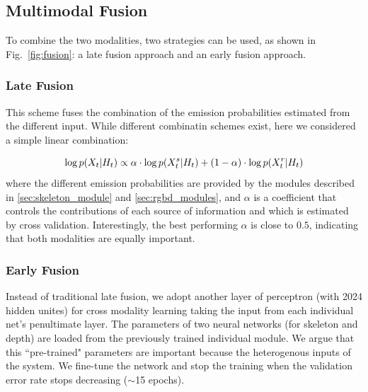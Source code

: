 \subsection{Multimodal Fusion}
To combine the two modalities, two strategies can be used, as shown in Fig.~\ref{fig:fusion}: 
a late fusion approach and an early fusion approach.


\subsubsection{Late Fusion}
%
This scheme fuses the combination of the emission probabilities estimated from the different input. 
While different combinatin schemes exist, here we considered a simple linear combination:

\begin{equation}
\log p(X_t | H_t)  \propto  \alpha \cdot \log p(X_t^s | H_t) + (1-\alpha)\cdot \log p(X_t^r | H_t)
\end{equation}
where the different emission probabilities are provided by the modules described in \ref{sec:skeleton_module} and \ref{sec:rgbd_modules},
and $\alpha$ is a coefficient that controls the contributions of each source of information and which is estimated by cross validation.
Interestingly, the best performing $\alpha$ is close to $0.5$, indicating that both modalities are equally important.


\subsubsection{Early Fusion}\label{early_fusion}

Instead of traditional late fusion, we adopt another layer of perceptron (with 2024 hidden unites) for cross modality learning taking the input from each individual net's penultimate layer.
The parameters of two neural networks (for skeleton and depth) are loaded from the previously trained individual module. We argue that this ``pre-trained" parameters are important because the heterogenous inputs of the system.  We fine-tune the network and stop the training when the validation error rate stops decreasing ($\sim$15 epochs).

